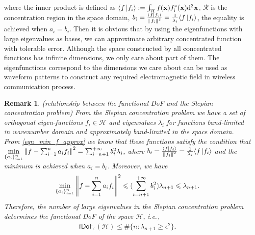 \documentclass[12pt,draftclsnofoot,journal,onecolumn]{IEEEtran}
\newtheorem{remark}{Remark}
\begin{document}
	where the inner product is defined as $\langle f \ket{f_i}:= \int_{\mathcal{R}} f({\bf x}) f_i^*({\bf x}) {\rm d}^3{\bf x}$, $\mathcal{R}$ is the concentration region in the space domain, $b_i = \frac{ \langle f \ket{f_i}}{\left\| f_i \right\|^2}= \frac{1}{\lambda_i} \langle f \ket{f_i}$, the equality is achieved when $a_i=b_i$. Then it is obvious that by using the eigenfunctions with large eigenvalues as bases, we can approximate arbitrary concentrated function with tolerable error. Although the space constructed by all concentrated functions has infinite dimensions, we only care about part of them. The eigenfunctions correspond to the dimensions we care about can be used as waveform patterns to construct any required electromagnetic field in wireless communication process.     
	
	\begin{remark}
		\label{remark_fDoF_eigenvalues}
		(relationship between the functional DoF and the Slepian concentration problem) From the Slepian concentration problem we have a set of orthogonal eigen-functions $f_i \in \mathcal{H}$ and eigenvalues $\lambda_i$ for functions band-limited in wavenumber domain and approximately band-limited in the space domain. From \eqref{eqn_min_f_approx} we know that these functions satisfy the condition that $\underset{\{a_i\}_{i=1}^n}{\rm min}\left\| f- \sum_{i=1}^n a_i f_i    \right\|^2 = \sum_{i=n+1}^{+\infty}b_i^2 \lambda_i $, where $b_i =\frac{ \langle f \ket{f_i}}{\left\| f_i \right\|^2}= \frac{1}{\lambda_i} \langle f \ket{f_i}$ and the minimum is achieved when $a_i=b_i$. Moreover, we have
		\begin{equation}
			\begin{aligned}
				\underset{\{a_i\}_{i=1}^n}{\rm min}\left\| f- \sum_{i=1}^n a_i f_i    \right\|^2	\leqslant (\sum_{i=n+1}^{+\infty}b_i^2) \lambda_{n+1} \leqslant \lambda_{n+1}.
			\end{aligned}
		\end{equation}  
		Therefore, the number of large eigenvalues in the Slepian concentration problem determines the functional DoF of the space $\mathcal{H}$, i.e.,
		\begin{equation}
			\begin{aligned}
				\mathsf{fDoF}_{\epsilon} (\mathcal{H}) \leqslant \#\{n: \lambda_{n+1} \geqslant \epsilon^2\}.
			\end{aligned}
		\end{equation} 
	\end{remark}
\end{document}
